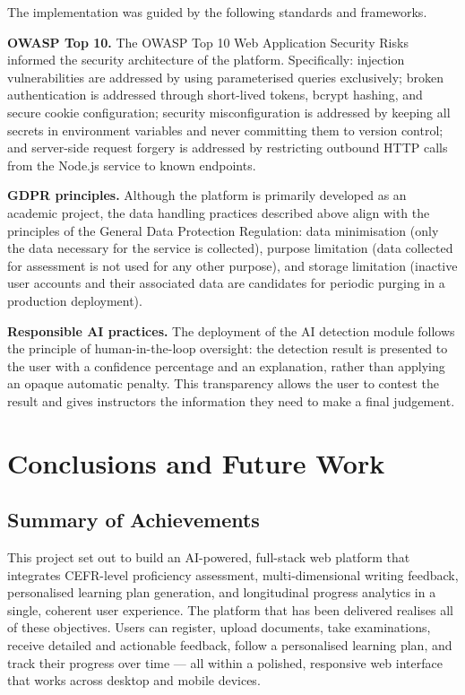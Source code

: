 \documentclass[12pt, a4paper]{report}
\begin{document}
The implementation was guided by the following standards and frameworks.

\textbf{OWASP Top 10.} The OWASP Top 10 Web Application Security Risks \cite{owasp2025} informed the security architecture of the platform. Specifically: injection vulnerabilities are addressed by using parameterised queries exclusively; broken authentication is addressed through short-lived tokens, bcrypt hashing, and secure cookie configuration; security misconfiguration is addressed by keeping all secrets in environment variables and never committing them to version control; and server-side request forgery is addressed by restricting outbound HTTP calls from the Node.js service to known endpoints.

\textbf{GDPR principles.} Although the platform is primarily developed as an academic project, the data handling practices described above align with the principles of the General Data Protection Regulation: data minimisation (only the data necessary for the service is collected), purpose limitation (data collected for assessment is not used for any other purpose), and storage limitation (inactive user accounts and their associated data are candidates for periodic purging in a production deployment).

\textbf{Responsible AI practices.} The deployment of the AI detection module follows the principle of human-in-the-loop oversight: the detection result is presented to the user with a confidence percentage and an explanation, rather than applying an opaque automatic penalty. This transparency allows the user to contest the result and gives instructors the information they need to make a final judgement.

\chapter{Conclusions and Future Work}
\label{ch:conclusion}

\section{Summary of Achievements}

This project set out to build an AI-powered, full-stack web platform that integrates CEFR-level proficiency assessment, multi-dimensional writing feedback, personalised learning plan generation, and longitudinal progress analytics in a single, coherent user experience. The platform that has been delivered realises all of these objectives. Users can register, upload documents, take examinations, receive detailed and actionable feedback, follow a personalised learning plan, and track their progress over time — all within a polished, responsive web interface that works across desktop and mobile devices.
\end{document}
